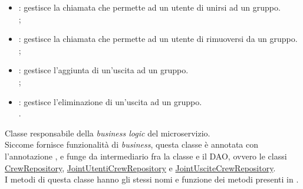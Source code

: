 \begin{itemize}
          ;
    \item {}: gestisce la chiamata che permette ad un
          utente di unirsi ad un gruppo. \\
          ;
    \item {}: gestisce la chiamata che permette ad
          un utente di rimuoversi da un gruppo. \\
          ;
    \item {}:  gestisce l'aggiunta di un'uscita ad un
          gruppo. \\
          ;
    \item {}: gestisce l'eliminazione di un'uscita
          ad un gruppo. \\
          .
\end{itemize}

Classe responsabile della \textit{business logic} del \gls{microservizio}.  \\
Siccome fornisce funzionalità di \textit{business}, questa classe è annotata
con l'annotazione , e funge da intermediario fra la classe
 e  il \gls{DAO}, ovvero le classi
\hyperref[CrewRepository]{CrewRepository},
\hyperref[JointUtentiCrewRepository]{JointUtentiCrewRepository} e
\hyperref[JointUsciteCrewRepository]{JointUsciteCrewRepository}. \\
I metodi di questa classe hanno gli stessi nomi e funzione dei metodi presenti
in .

